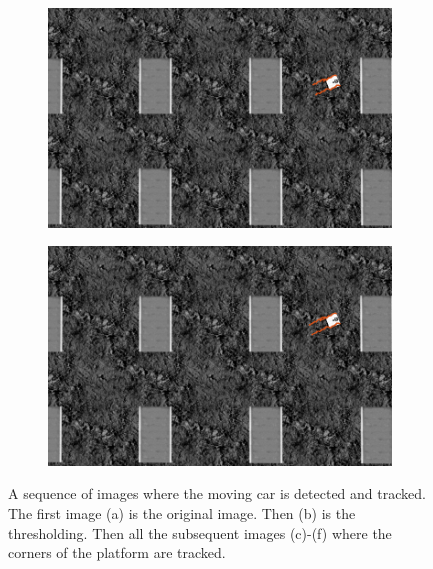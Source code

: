 \begin{figure}[!htbp]
    \begin{subfigure}[b]{0.45\textwidth}
        \includegraphics[width=\textwidth]{img/18856_optical_flow.png}\label{fig:optical5}
                \caption{}
   \end{subfigure}  \hfill
    \begin{subfigure}[b]{0.45\textwidth}
        \includegraphics[width=\textwidth]{img/18881_optical_flow.png}\label{fig:optical6}
                \caption{}
   \end{subfigure}
  
 \caption{A sequence of images where the moving car is detected and tracked. The first image (a) is the original image. Then (b) is the thresholding. Then all the subsequent images (c)-(f) where the corners of the platform are tracked.}
  \label{fig:optical_folw_sequence}
\end{figure} 

